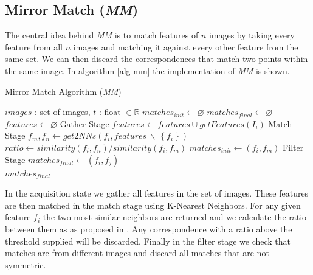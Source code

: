 \documentclass[12pt,journal,compsoc]{IEEEtran}
\begin{document}
\subsection{Mirror Match (\emph{MM})}
%
The central idea behind \emph{MM} is to match features of $n$ images by 
taking every feature from all $n$ images and matching it against every 
other feature from the same set. We can then discard the correspondences 
that match two points within the same image. In algorithm \ref{alg-mm} 
the implementation of \emph{MM} is shown.
%
\begin{algorithm}
\caption{Mirror Match Algorithm (\emph{MM})}
\label{alg-mm}
\begin{algorithmic}
\Require $images$ : set of images, $t$ : float $\in \mathbb{R}$
\State $matches_{init}\gets \varnothing$
\State $matches_{final}\gets \varnothing$
\State $features\gets \varnothing$
 \Comment Gather Stage
	\State $features\gets features \cup getFeatures(I_i)$
\EndFor
{} \Comment Match Stage
	\State $f_m,f_n \gets get2NNs(f_i, features ~ \backslash ~ 
	\left\{f_i\right\})$
	\State $ratio \gets similarity(f_i, f_n) / similarity(f_i, f_m)$
		\State $matches_{init} \gets \left(f_i, f_m\right)$
	\EndIf
\EndFor
{} \Comment Filter 
Stage
		\State $matches_{final} \gets (f_i, f_j)$
	\EndIf
\EndFor \\
\Return $matches_{final}$
\end{algorithmic}
\end{algorithm}
%
In the acquisition state we gather all features in the set of images.  
These features are then matched in the match stage using K-Nearest 
Neighbors.  For any given feature $f_i$ the two most similar neighbors 
are returned and we calculate the ratio between them as as proposed in 
\cite{lowe2004sift}.  Any correspondence with a ratio above the 
threshold supplied will be discarded. Finally in the filter stage we 
check that matches are from different images and discard all matches 
that are not symmetric.
%
\end{document}
